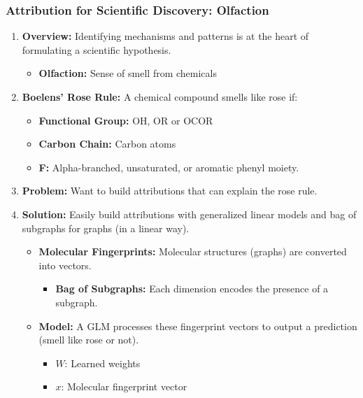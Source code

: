 \subsubsection{Attribution for Scientific Discovery: Olfaction}
\begin{example}
    \begin{enumerate}
        \item \textbf{Overview:} Identifying mechanisms and patterns is at the heart of formulating a scientific hypothesis.
        \begin{itemize}
            \item \textbf{Olfaction:} Sense of smell from chemicals 
        \end{itemize}
        \item \textbf{Boelens' Rose Rule:} A chemical compound smells like rose if: 
        \begin{itemize}
            \item \textbf{Functional Group:} OH, OR or OCOR
            \item \textbf{Carbon Chain:} Carbon atoms
            \item \textbf{F:} Alpha-branched, unsaturated, or aromatic phenyl moiety. 
        \end{itemize}
        \item \textbf{Problem:} Want to build attributions that can explain the rose rule.
        \item \textbf{Solution:} Easily build attributions with generalized linear models and bag of subgraphs for graphs (in a linear way).
        \begin{itemize}
            \item \textbf{Molecular Fingerprints:} Molecular structures (graphs) are converted into vectors.
            \begin{itemize}
                \item \textbf{Bag of Subgraphs:} Each dimension encodes the presence of a subgraph.
            \end{itemize}
            \item \textbf{Model:} A GLM processes these fingerprint vectors to output a prediction (smell like rose or not).
            \begin{itemize}
                \item $W$: Learned weights 
                \item $x$: Molecular fingerprint vector

\end{itemize}
\end{itemize}
\end{enumerate}
\end{example}
